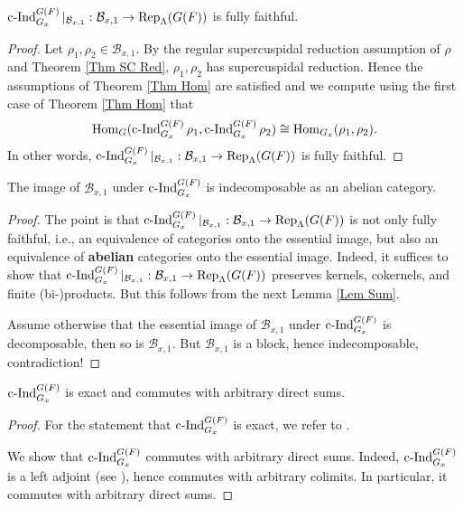 		\begin{lemma}\label{Lem Thm Hom implies fully faithful}
			$\operatorname{\operatorname{c-Ind}}_{G_x}^{G(F)}|_{\mathcal{B}_{x,1}}: \mathcal{B}_{x,1} \to \operatorname{\operatorname{Rep}}_{\Lambda}(G(F))$ is fully faithful.
		\end{lemma}
		
		\begin{proof}
			Let $\rho_1, \rho_2 \in \mathcal{B}_{x,1}$. By the regular supercuspidal reduction assumption of $\rho$ and Theorem \ref{Thm SC Red}, $\rho_1, \rho_2$ has supercuspidal reduction. Hence the assumptions of Theorem \ref{Thm Hom} are satisfied and we compute using the first case of Theorem \ref{Thm Hom} that
			$$\operatorname{\operatorname{Hom}}_G(\operatorname{\operatorname{c-Ind}}_{G_x}^{G(F)}\rho_1, \operatorname{\operatorname{c-Ind}}_{G_x}^{G(F)}\rho_2) \cong \operatorname{\operatorname{Hom}}_{G_x}(\rho_1, \rho_2).$$
			In other words, $\operatorname{\operatorname{c-Ind}}_{G_x}^{G(F)}|_{\mathcal{B}_{x,1}}: \mathcal{B}_{x,1} \to \operatorname{\operatorname{Rep}}_{\Lambda}(G(F))$ is fully faithful.
		\end{proof}
		
		\begin{lemma}\label{Lem Indec}
			The image of $\mathcal{B}_{x,1}$ under $\operatorname{\operatorname{c-Ind}}_{G_x}^{G(F)}$ is indecomposable as an abelian category.
		\end{lemma}
		
		\begin{proof}
			The point is that $\operatorname{\operatorname{c-Ind}}_{G_x}^{G(F)}|_{\mathcal{B}_{x,1}}: \mathcal{B}_{x,1} \to \operatorname{\operatorname{Rep}}_{\Lambda}(G(F))$ is not only fully faithful, i.e., an equivalence of categories onto the essential image, but also an equivalence of \textbf{abelian} categories onto the essential image. Indeed, it suffices to show that $\operatorname{\operatorname{c-Ind}}_{G_x}^{G(F)}|_{\mathcal{B}_{x,1}}: \mathcal{B}_{x,1} \to \operatorname{\operatorname{Rep}}_{\Lambda}(G(F))$ preserves kernels, cokernels, and finite (bi-)products. But this follows from the next Lemma \ref{Lem Sum}.
			
			Assume otherwise that the essential image of $\mathcal{B}_{x,1}$ under $\operatorname{\operatorname{c-Ind}}_{G_x}^{G(F)}$ is decomposable, then so is $\mathcal{B}_{x,1}$. But $\mathcal{B}_{x,1}$ is a block, hence indecomposable, contradiction!
		\end{proof}
		
		\begin{lemma}\label{Lem Sum}
			$\operatorname{\operatorname{c-Ind}}_{G_x}^{G(F)}$ is exact and commutes with arbitrary direct sums.
		\end{lemma}
		
		\begin{proof}
			For the statement that $\operatorname{\operatorname{c-Ind}}_{G_x}^{G(F)}$ is exact, we refer to \cite[I.5.10]{vigneras1996representations}.
			
			We show that $\operatorname{\operatorname{c-Ind}}_{G_x}^{G(F)}$ commutes with arbitrary direct sums. Indeed, $\operatorname{\operatorname{c-Ind}}_{G_x}^{G(F)}$ is a left adjoint (see \cite[I.5.7]{vigneras1996representations}), hence commutes with arbitrary colimits. In particular, it commutes with arbitrary direct sums.
		\end{proof}
		
